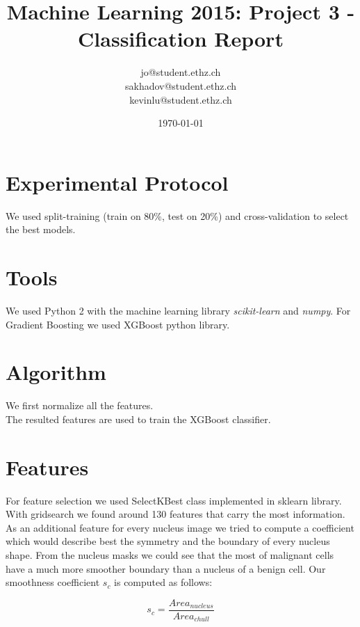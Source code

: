 \documentclass[a4paper, 11pt]{article}
\title{Machine Learning 2015: Project 3 - Classification Report}
\author{jo@student.ethz.ch\\ sakhadov@student.ethz.ch\\ kevinlu@student.ethz.ch\\}
\date{\today}
\begin{document}
\maketitle

\section*{Experimental Protocol}
We used split-training (train on 80\%, test on 20\%) and cross-validation to select the best models. \\

\section{Tools}
We used Python 2 with the machine learning library \textit{scikit-learn} and \textit{numpy}. For Gradient Boosting we used XGBoost python library.

\section{Algorithm}
We first normalize all the features.\\
The resulted features are used to train the XGBoost classifier.\\

\section{Features}
For feature selection we used SelectKBest class implemented in sklearn library. With gridsearch we found around 130 features that carry the most information.\\
As an additional feature for every nucleus image we tried to compute a coefficient which would describe best the symmetry and the boundary of every nucleus shape. From the nucleus masks we could see that the most of malignant cells have a much more smoother boundary than a nucleus of a benign cell. Our smoothness coefficient $s_c$ is computed as follows:

\begin{equation}
s_c = \frac{ Area_{nucleus} }{Area_{chull}}
\end{equation}
\end{document}

